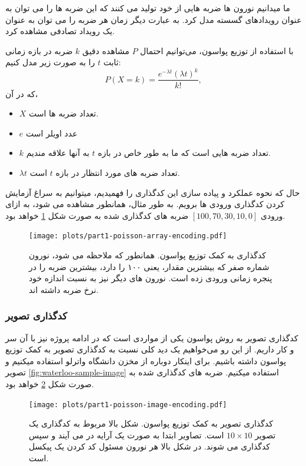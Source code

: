         ما میدانیم نورون ها ضربه هایی از خود تولید می کنند که این ضربه ها را می توان به عنوان رویدادهای گسسته مدل کرد. به عبارت دیگر زمان هر ضربه را می توان به عنوان یک رویداد تصادفی مشاهده کرد.
        
        با استفاده از توزیع پواسون، می‌توانیم احتمال 
        $P$ 
        مشاهده دقیق 
        $k$ 
        ضربه در بازه زمانی ثابت 
        $t$ 
        را به صورت زیر مدل کنیم:\cite{Poisson-Distribution-Wikipedia}
        \begin{equation}
            P(X=k)=\frac{e^{-\lambda t} {(\lambda t)}^{k}}{k!},
        \end{equation}
        که در آن، 
        \begin{itemize}
            \item $X$ تعداد ضربه ها است.
            \item $e$ عدد اویلر است
            \item $k$ تعداد ضربه هایی است که ما به طور خاص در بازه 
            $t$ 
            به آنها علاقه مندیم.
            \item $\lambda t$ تعداد ضربه های مورد انتظار در بازه 
            $t$ 
            است.
        \end{itemize}

        حال که نحوه عملکرد و پیاده سازی این کدگذاری را فهمیدیم، میتوانیم به سراغ آزمایش کردن کدگذاری ورودی ها برویم. به طور مثال، همانطور مشاهده می شود، به ازای ورودی 
        $[100, 70, 30, 10, 0]$ 
        ضربه های کدگذاری شده به صورت شکل
        \ref{fig:part1-poisson-array-encoding}
        خواهد بود.
        \begin{figure}[!ht]
            \centering
            \texttt{[image: plots/part1-poisson-array-encoding.pdf]} 
            \caption{کدگذاری به کمک توزیع پواسون. همانطور که ملاحظه می شود، نورون شماره صفر که بیشترین مقدار، یعنی ۱۰۰ را دارد، بیشترین ضربه را در پنجره زمانی ورودی زده است. نورون های دیگر نیز به نسبت اندازه خود نرخ ضربه داشته اند.}
            \label{fig:part1-poisson-array-encoding}
        \end{figure}

        \subsubsection*{کدگذاری تصویر}
            کدگذاری تصویر به روش پواسون یکی از مواردی است که در ادامه پروژه نیز با آن سر و کار داریم. از این رو می‌خواهیم یک دید کلی نسبت به کدگذاری تصویر به کمک توزیع پواسون داشته باشیم. برای اینکار دوباره از مخزن دانشگاه واترلو استفاده میکنیم و تصویر 
            \ref{fig:waterloo-sample-image}
            استفاده میکنیم. 
            ضربه های کدگذاری شده به صورت شکل
            \ref{fig:part1-poisson-image-encoding}
            خواهد بود.
            \begin{figure}[H]
                \centering
                \texttt{[image: plots/part1-poisson-image-encoding.pdf]} 
                \caption{کدگذاری تصویر به کمک توزیع پواسون. شکل بالا مربوط به کدگذاری یک تصویر 
                $10\times 10$ 
                است. تصاویر ابتدا به صورت یک آرایه در می آیند و سپس کدگذاری می شوند. در شکل بالا هر نورون مسئول کد کردن یک پیکسل است.}
                \label{fig:part1-poisson-image-encoding}
            \end{figure}